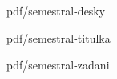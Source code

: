 \documentclass[%
  12pt,       				%
  a4paper,    				%
  oneside,      			%
	unicode						%
]{report}				    	%
\begin{document}
\pagestyle{empty} %

  {pdf/semestral-desky}%

  {pdf/semestral-titulka}%
\oddpage  %
   
  {pdf/semestral-zadani}%
\oddpage%


% 

\makecitation

\makedeclaration

\makeacknowledgement

\tableofcontents

\listoffigures

\listoftables


\cleardoublepage\pagestyle{plain}   %
\end{document}
